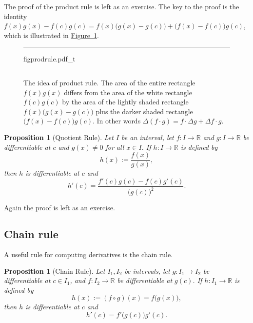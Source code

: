 \documentclass[12pt]{book}
\newenvironment{myfigureht}{%
\begin{figure}[h!t]
\noindent\rule{\textwidth}{0.4pt}\vspace{12pt}\par\centering}%
{\par\noindent\rule{\textwidth}{0.4pt}
\end{figure}}
\newcommand{\R}{{\mathbb{R}}}
\theoremstyle{plain}
\newtheorem{prop}[thm]{Proposition}
\theoremstyle{remark}
\theoremstyle{definition}
\theoremstyle{exercise}
\theoremstyle{example}
\newcommand{\figureref}[1]{\hyperref[#1]{Figure~\ref*{#1}}}
\begin{document}
The proof of the product rule is left as an exercise.  The key to the proof is 
the identity
$f(x) g(x) - f(c) g(c) =
f(x)\bigl( g(x) - g(c) \bigr)
+ \bigl( f(x) - f(c) \bigr) g(c)$,
which is illustrated in \figureref{figprodrule}.
\begin{myfigureht}
{figprodrule.pdf_t}
\caption{The idea of product rule.  The area of the entire rectangle
$f(x)g(x)$ differs from the area of the white rectangle $f(c)g(c)$
by the area of the lightly shaded rectangle
$f(x)\bigl( g(x) - g(c) \bigr)$ plus the darker shaded rectangle
$\bigl( f(x) - f(c) \bigr) g(c)$.
In other words $\Delta (f \cdot g)
= f \cdot \Delta g + \Delta f \cdot g$.\label{figprodrule}}
\end{myfigureht}



\begin{prop}[Quotient Rule]
Let $I$ be an interval, let
$f \colon I \to \R$ and $g \colon I \to \R$ be differentiable at $c$
and $g(x) \not= 0$ for all $x \in I$.
If $h \colon I \to \R$
is defined by
\begin{equation*}
h(x) := \frac{f(x)}{g(x)},
\end{equation*}
then $h$ is differentiable at $c$ and
\begin{equation*}
h'(c) = \frac{f'(c) g(c) - f(c) g'(c)}{{\bigl(g(c)\bigr)}^2} .
\end{equation*}
\end{prop}

Again the proof is left as an exercise.

\subsection{Chain rule}

A useful rule for computing derivatives 
is the chain rule.

\begin{prop}[Chain Rule]
Let $I_1, I_2$ be intervals, let
$g \colon I_1 \to I_2$ be differentiable at $c \in I_1$,
and
$f \colon I_2 \to \R$ be differentiable at $g(c)$.
If $h \colon I_1 \to \R$
is defined by
\begin{equation*}
h(x) := (f \circ g) (x) = f\bigl(g(x)\bigr) ,
\end{equation*}
then $h$ is differentiable at $c$ and
\begin{equation*}
h'(c) = f'\bigl(g(c)\bigr)g'(c) .
\end{equation*}
\end{prop}
\end{document}
